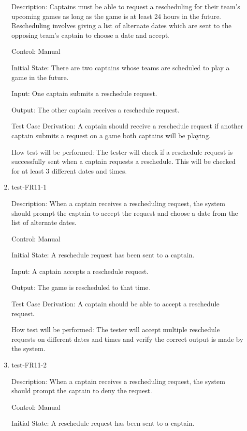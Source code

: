 \documentclass[12pt, titlepage]{article}
\begin{document}
\begin{enumerate}
  Description: Captains must be able to request a rescheduling
  for their team’s upcoming games as long as the game is at
  least 24 hours in the future. Rescheduling involves giving
  a list of alternate dates which are sent to the opposing
  team’s captain to choose a date and accept.

  Control: Manual

  Initial State: There are two captains whose teams are scheduled to play a
  game in the future.

  Input: One captain submits a reschedule request.

  Output: The other captain receives a reschedule request.

  Test Case Derivation: A captain should receive a reschedule request if another
  captain submits a request on a game both captains will be playing.

  How test will be performed: The tester will check if a reschedule request is
  successfully sent when a captain requests a reschedule. This will be checked
  for at least 3 different dates and times.

  \item{test-FR11-1\\}
  
  Description: When a captain receives a rescheduling request,
  the system should prompt the captain to accept
  the request and choose a date from the list of alternate
  dates.

  Control: Manual

  Initial State: A reschedule request has been sent to a captain.

  Input: A captain accepts a reschedule request.

  Output: The game is rescheduled to that time.

  Test Case Derivation: A captain should be able to accept a reschedule
  request.

  How test will be performed: The tester will accept multiple reschedule
  requests on different dates and times and verify the correct output is made by
  the system.

  \item{test-FR11-2\\}
  
  Description: When a captain receives a rescheduling request,
  the system should prompt the captain to deny the request.

  Control: Manual

  Initial State: A reschedule request has been sent to a captain.


\end{enumerate}
\end{document}
